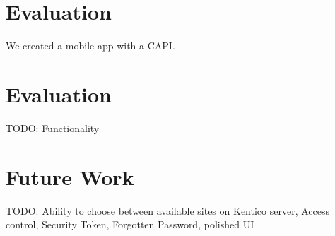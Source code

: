 \section{Evaluation}
We created a mobile app with a CAPI. 
\section{Evaluation}
TODO: Functionality

\section{Future Work}
TODO: Ability to choose between available sites on Kentico server, Access control, Security Token, Forgotten Password, polished UI
